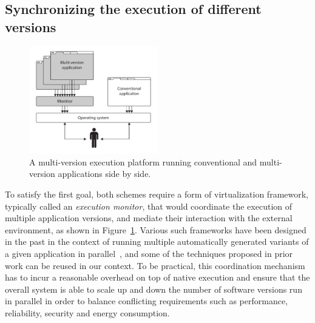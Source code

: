 
\subsection{Synchronizing the execution of different versions}

\begin{figure}[t]
  \begin{center}
    \includegraphics[width=0.5\textwidth]{multi-version/figures/platform}
    \caption{A multi-version execution platform running conventional and multi-version
      applications side by side.}
    \label{fig:mx-platform}
  \end{center}
\end{figure}

To satisfy the first goal, both schemes require a form of virtualization
framework, typically called an \emph{execution monitor}, that would coordinate
the execution of multiple application versions, and mediate their interaction
with the external environment, as shown in Figure~\ref{fig:mx-platform}.
Various such frameworks have been designed in the past in the context of
running multiple automatically generated variants of a given application in
parallel~\cite{diehard06,cox2006,orchestra09}, and some of the techniques
proposed in prior work can be reused in our context. To be practical, this
coordination mechanism has to incur a reasonable overhead on top of native
execution and ensure that the overall system is able to scale up and down the
number of software versions run in parallel in order to balance conflicting
requirements such as performance, reliability, security and energy consumption.

